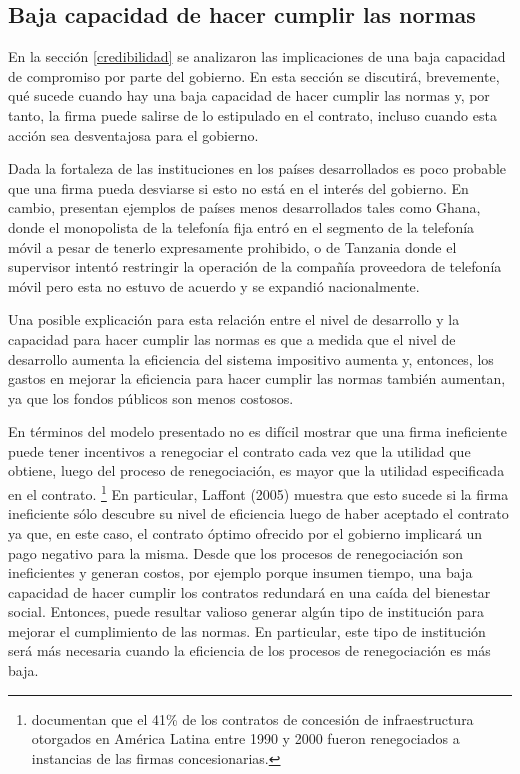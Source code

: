 \documentclass[
  12pt,
  spanish,
]{book}
\begin{document}
\hypertarget{baja-capacidad-de-hacer-cumplir-las-normas}{%
\subsection{Baja capacidad de hacer cumplir las normas}\label{baja-capacidad-de-hacer-cumplir-las-normas}}

En la sección \ref{credibilidad} se analizaron las implicaciones de una baja capacidad de compromiso por parte del gobierno. En esta sección se discutirá, brevemente, qué sucede cuando hay una baja capacidad de hacer cumplir las normas y, por tanto, la firma puede salirse de lo estipulado en el contrato, incluso cuando esta acción sea desventajosa para el gobierno.

Dada la fortaleza de las instituciones en los países desarrollados es poco probable que una firma pueda desviarse si esto no está en el interés del gobierno. En cambio, \citet{Estache2009} presentan ejemplos de países menos desarrollados tales como Ghana, donde el monopolista de la telefonía fija entró en el segmento de la telefonía móvil a pesar de tenerlo expresamente prohibido, o de Tanzania donde el supervisor intentó restringir la operación de la compañía proveedora de telefonía móvil pero esta no estuvo de acuerdo y se expandió nacionalmente.

Una posible explicación para esta relación entre el nivel de desarrollo y la capacidad para hacer cumplir las normas es que a medida que el nivel de desarrollo aumenta la eficiencia del sistema impositivo aumenta y, entonces, los gastos en mejorar la eficiencia para hacer cumplir las normas también aumentan, ya que los fondos públicos son menos costosos.

En términos del modelo presentado no es difícil mostrar que una firma ineficiente puede tener incentivos a renegociar el contrato cada vez que la utilidad que obtiene, luego del proceso de renegociación, es mayor que la utilidad especificada en el contrato.
\footnote{\citet{Guasch2006} documentan que el 41\% de los contratos de concesión de infraestructura otorgados en América Latina entre 1990 y 2000 fueron renegociados a instancias de las firmas concesionarias.}
En particular, Laffont (2005) muestra que esto sucede si la firma ineficiente sólo descubre su nivel de eficiencia luego de haber aceptado el contrato ya que, en este caso, el contrato óptimo ofrecido por el gobierno implicará un pago negativo para la misma. Desde que los procesos de renegociación son ineficientes y generan costos, por ejemplo porque insumen tiempo, una baja capacidad de hacer cumplir los contratos redundará en una caída del bienestar social. Entonces, puede resultar valioso generar algún tipo de institución para mejorar el cumplimiento de las normas. En particular, este tipo de institución será más necesaria cuando la eficiencia de los procesos de renegociación es más baja.
\end{document}
